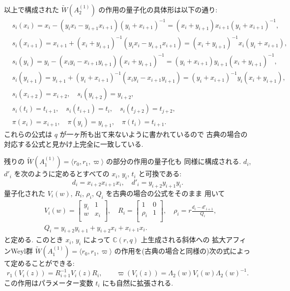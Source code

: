 \documentclass[12pt,twoside,dvipdfm]{msjproc}
\newcommand\C{{\mathbb C}} %
\theoremstyle{definition} %
\theoremstyle{definition} %
\theoremstyle{definition} %
\numberwithin{theorem}{section}
\numberwithin{equation}{section}
\numberwithin{figure}{section}
\numberwithin{table}{section}
\newcommand\bra{\langle}
\newcommand\ket{\rangle}
\newcommand\WW{\widetilde{W}}
\begin{document}
以上で構成された $\WW(A^{(1)}_2)$ の作用の量子化の具体形は以下の通り:
\begin{align*}
 &
 s_i(x_i) 
 = x_i - (y_i x_i - y_{i+1}x_{i+1})(y_i+x_{i+1})^{-1}
 = (x_i+y_{i+1})x_{i+1}(y_i+x_{i+1})^{-1},
 \\ &
 s_i(x_{i+1})
 = x_{i+1} +(x_i+y_{i+1})^{-1}(y_i x_i - y_{i+1}x_{i+1})
 =(x_i+y_{i+1})^{-1} x_i (y_i+x_{i+1}),
 \\ &
 s_i(y_i) 
 = y_i - (x_i y_i - x_{i+1}y_{i+1})(x_i+y_{i+1})^{-1}
 = (y_i+x_{i+1})y_{i+1}(x_i+y_{i+1})^{-1},
 \\ &
  s_i(y_{i+1})
 = y_{i+1} +(y_i+x_{i+1})^{-1}(x_i y_i - x_{i+1}y_{i+1})
 =(y_i+x_{i+1})^{-1} y_i (x_i+y_{i+1}),
 \\ &
 s_i(x_{i+2})=x_{i+2},
 \quad
 s_i(y_{i+2})=y_{i+2}, 
 \\ &
 s_i(t_i)=t_{i+1},  \quad
 s_i(t_{i+1})=t_i,  \quad
 s_i(t_{j+2})=t_{j+2},
 \\ &
 \pi(x_i) = x_{i+1},  \quad
 \pi(y_i) = y_{i+1},  \quad
 \pi(t_i) = t_{i+1}.
\end{align*}
これらの公式は $q$ が一ヶ所も出て来ないように書かれているので
古典の場合の対応する公式と見かけ上完全に一致している.

残りの $\WW(A^{(1)}_1)=\bra r_0,r_1,\varpi\ket$ の部分の作用の量子化も
同様に構成される.
$d_i$, $d'_i$ を次のように定めるとすべての $x_i$, $y_i$, $t_i$ と可換である:
\begin{equation*}
  d_i  = x_{i+2}x_{i+1}x_i, \quad
  d'_i = y_{i+2}y_{i+1}y_i.
\end{equation*}
量子化された $V_i(w)$, $R_i$, $\rho_i$, $Q_i$ を古典の場合の公式をそのまま
用いて
\begin{align*}
  &
  V_i(w) =
  \begin{bmatrix}
    y_i & 1   \\
    w   & x_i \\
  \end{bmatrix},
  \quad
  R_i =
  \begin{bmatrix}
    1      & 0 \\
    \rho_i & 1 \\
  \end{bmatrix},
  \quad
  \rho_i = r \frac{d_i - d'_{i+1}}{Q_i},
  \\ &
  Q_i = y_{i+2}y_{i+1} + y_{i+2}x_i + x_{i+1}x_i.
\end{align*}
と定める. このとき $x_i$, $y_i$ によって $\C(r,q)$ 上生成される斜体への
拡大アフィンWeyl群 $\WW(A^{(1)}_1)=\bra r_0,r_1,\varpi\ket$
の作用を(古典の場合と同様の)次の式によって定めることができる:
\begin{equation*}
  r_1(V_i(z)) = R_{i+1}^{-1} V_i(z) R_i, \qquad
  \varpi(V_i(z)) = \Lambda_2(w)V_i(w)\Lambda_2(w)^{-1}.
\end{equation*}
この作用はパラメーター変数 $t_i$ にも自然に拡張される.
\end{document}
